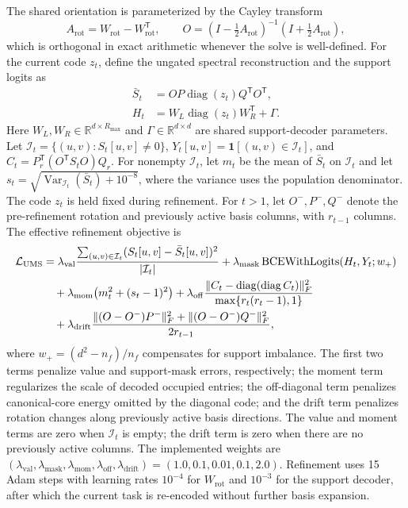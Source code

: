 The shared orientation is parameterized by the Cayley transform
\begin{equation}
 A_{\mathrm{rot}}=W_{\mathrm{rot}}-W_{\mathrm{rot}}^{\mathsf T},\qquad
 O=\left(I-\tfrac{1}{2}A_{\mathrm{rot}}\right)^{-1}
   \left(I+\tfrac{1}{2}A_{\mathrm{rot}}\right),
 \label{eq:cayley}
\end{equation}
which is orthogonal in exact arithmetic whenever the solve is well-defined.
For the current code $z_t$, define the ungated spectral reconstruction and the
support logits as
\begin{align}
 \bar S_t &= OP\operatorname{diag}(z_t)Q^{\mathsf T}O^{\mathsf T},
 \label{eq:ungated_reconstruction}\\
 H_t &= W_L\operatorname{diag}(z_t)W_R^{\mathsf T}+\Gamma.
 \label{eq:support_logits}
\end{align}
Here $W_L,W_R\in\mathbb{R}^{d\times R_{\max}}$ and
$\Gamma\in\mathbb{R}^{d\times d}$ are shared support-decoder parameters.  Let
$\mathcal{I}_t=\{(u,v):S_t[u,v]\neq0\}$,
$Y_t[u,v]=\mathbf{1}[(u,v)\in\mathcal{I}_t]$, and
$C_t=P_r^{\mathsf T}(O^{\mathsf T}S_tO)Q_r$.  For nonempty $\mathcal{I}_t$,
let $m_t$ be the mean of $\bar S_t$ on $\mathcal{I}_t$ and let
$s_t=\sqrt{\operatorname{Var}_{\mathcal{I}_t}(\bar S_t)+10^{-8}}$,
where the variance uses the population denominator.  The code $z_t$ is held
fixed during refinement.  For $t>1$, let $O^{-},P^{-},Q^{-}$ denote the
pre-refinement rotation and previously active basis columns, with
$r_{t-1}$ columns.  The effective refinement objective is
\begin{align}
 \mathcal{L}_{\mathrm{UMS}}
 &=\lambda_{\mathrm{val}}
   \frac{\sum_{(u,v)\in\mathcal{I}_t}(S_t[u,v]-\bar S_t[u,v])^2}
        {|\mathcal{I}_t|}
 +\lambda_{\mathrm{mask}}\operatorname{BCEWithLogits}(H_t,Y_t;w_+)
 \notag\\
 &\quad+\lambda_{\mathrm{mom}}\bigl(m_t^2+(s_t-1)^2\bigr)
 +\lambda_{\mathrm{off}}
   \frac{\|C_t-\operatorname{diag}(\operatorname{diag}C_t)\|_F^2}
        {\max\{r_t(r_t-1),1\}}
 \notag\\
 &\quad+\lambda_{\mathrm{drift}}
   \frac{\|(O-O^{-})P^{-}\|_F^2+\|(O-O^{-})Q^{-}\|_F^2}
        {2r_{t-1}},
 \label{eq:loss_total}
\end{align}
where $w_+=(d^2-n_f)/n_f$ compensates for support imbalance.  The first two
terms penalize value and support-mask errors, respectively; the moment term
regularizes the scale of decoded occupied entries; the off-diagonal term
penalizes canonical-core energy omitted by the diagonal code; and the drift
term penalizes rotation changes along previously active basis directions.  The
value and moment terms are zero when $\mathcal{I}_t$ is empty; the drift term
is zero when there are no previously active columns.  The implemented weights are
$(\lambda_{\mathrm{val}},\lambda_{\mathrm{mask}},\lambda_{\mathrm{mom}},
\lambda_{\mathrm{off}},\lambda_{\mathrm{drift}})
=(1.0,0.1,0.01,0.1,2.0)$.  Refinement uses 15 Adam steps with learning rates
$10^{-4}$ for $W_{\mathrm{rot}}$ and $10^{-3}$ for the support decoder, after
which the current task is re-encoded without further basis expansion.

